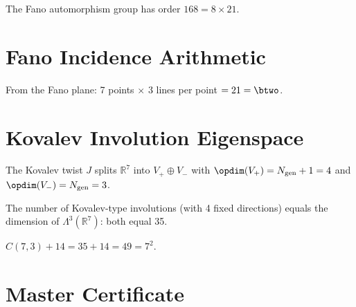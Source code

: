 \begin{theorem}[$|\mathrm{PSL}(2,7)| = \mathrm{rank}(E_8) \times \btwo$]\label{thm:PSL27_factored}
    \leanok
    The Fano automorphism group has order $168 = 8 \times 21$.
\end{theorem}

\section{Fano Incidence Arithmetic}

\begin{theorem}[$\btwo = \opdim(K_7) \times N_{\mathrm{gen}}$]\label{thm:b2_fano_incidence}
    \leanok
    From the Fano plane: 7 points $\times$ 3 lines per point $= 21 = \btwo$.
\end{theorem}

\section{Kovalev Involution Eigenspace}

\begin{theorem}\label{thm:kovalev_eigenspace}
    \leanok
    The Kovalev twist $J$ splits $\mathbb{R}^7$ into $V_+ \oplus V_-$
    with $\opdim(V_+) = N_{\mathrm{gen}} + 1 = 4$ and
    $\opdim(V_-) = N_{\mathrm{gen}} = 3$.
\end{theorem}

\begin{theorem}[$C(7,4) = C(7,3) = 35$]\label{thm:kovalev_3form}
    \leanok
    The number of Kovalev-type involutions (with 4 fixed directions) equals
    the dimension of $\Lambda^3(\mathbb{R}^7)$: both equal 35.
\end{theorem}

\begin{theorem}[$35 + \opdim(\Gtwo) = \opdim(K_7)^2$]\label{thm:3form_plus_G2}
    \leanok
    $C(7,3) + 14 = 35 + 14 = 49 = 7^2$.
\end{theorem}

\section{Master Certificate}

